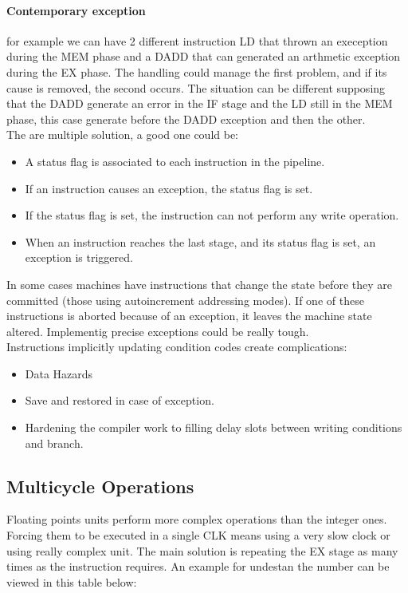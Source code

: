 \documentclass[12pt]{article}
\begin{document}
\paragraph{Contemporary exception} for example we can have 2 different instruction LD that thrown an exeception during the MEM phase and a DADD that can generated an arthmetic exception during the EX phase. The handling could manage the first problem, and if its cause is removed, the second occurs. The situation can be different supposing that the DADD generate an error in the IF stage and the LD still in the MEM phase, this case generate before the DADD exception and then the other.\\
The are multiple solution, a good one could be:
\begin{itemize}
  \item A status flag is associated to each instruction in the pipeline.
  \item If an instruction causes an exception, the status flag is set.
  \item If the status flag is set, the instruction can not perform any write operation.
  \item When an instruction reaches the last stage, and its status flag is set, an exception is triggered.
\end{itemize}
In some cases machines have instructions that change the state before they are committed (those using autoincrement addressing modes). If one of these instructions is aborted because of an exception, it leaves the machine state altered. Implementig precise exceptions could be really tough.\\
Instructions implicitly updating condition codes create complications:
\begin{itemize}
  \item Data Hazards
  \item Save and restored in case of exception.
  \item Hardening the compiler work to filling delay slots between writing conditions and branch.
\end{itemize}

\subsection{Multicycle Operations}
Floating points units perform more complex operations than the integer ones. Forcing them to be executed in a single CLK means using a very slow clock or using really complex unit. The main solution is repeating the EX stage as many times as the instruction requires. An example for undestan the number can be viewed in this table below:
\end{document}
